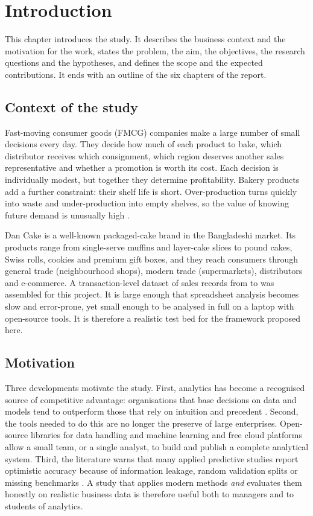 \chapter{Introduction}\label{ch:intro}

This chapter introduces the study. It describes the business context and the motivation for the work, states
the problem, the aim, the objectives, the research questions and the hypotheses, and defines the scope and the
expected contributions. It ends with an outline of the six chapters of the report.

\section{Context of the study}
Fast-moving consumer goods (FMCG) companies make a large number of small decisions every day. They decide how
much of each product to bake, which distributor receives which consignment, which region deserves another
sales representative and whether a promotion is worth its cost. Each decision is individually modest, but
together they determine profitability. Bakery products add a further constraint: their shelf life is short.
Over-production turns quickly into waste and under-production into empty shelves, so the value of knowing
future demand is unusually high \citep{hyndman2021}.

Dan Cake is a well-known packaged-cake brand in the Bangladeshi market. Its products range from single-serve
muffins and layer-cake slices to pound cakes, Swiss rolls, cookies and premium gift boxes, and they reach
consumers through general trade (neighbourhood shops), modern trade (supermarkets), distributors and
e-commerce. A transaction-level dataset of \NRows sales records from \DateMin to \DateMax was assembled for
this project. It is large enough that spreadsheet analysis becomes slow and error-prone, yet small enough to be
analysed in full on a laptop with open-source tools. It is therefore a realistic test bed for the framework
proposed here.

\section{Motivation}
Three developments motivate the study. First, analytics has become a recognised source of competitive
advantage: organisations that base decisions on data and models tend to outperform those that rely on
intuition and precedent \citep{davenport2007, provost2013}. Second, the tools needed to do this are no longer
the preserve of large enterprises. Open-source libraries for data handling and machine learning
\citep{mckinney2022, pedregosa2011} and free cloud platforms allow a small team, or a single analyst, to build
and publish a complete analytical system. Third, the literature warns that many applied predictive studies
report optimistic accuracy because of information leakage, random validation splits or missing benchmarks
\citep{kaufman2012, bergmeir2012}. A study that applies modern methods \emph{and} evaluates them honestly on
realistic business data is therefore useful both to managers and to students of analytics.


